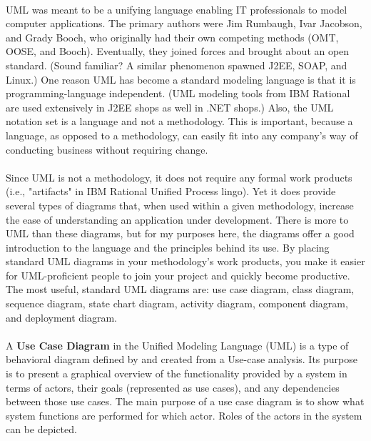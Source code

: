 \paragraph{}
UML was meant to be a unifying language enabling IT professionals to model computer applications. The primary authors were Jim Rumbaugh, Ivar Jacobson, and Grady Booch, who originally had their own competing methods (OMT, OOSE, and Booch). Eventually, they joined forces and brought about an open standard. (Sound familiar? A similar phenomenon spawned J2EE, SOAP, and Linux.) One reason UML has become a standard modeling language is that it is programming-language independent. (UML modeling tools from IBM Rational are used extensively in J2EE shops as well in .NET shops.) Also, the UML notation set is a language and not a methodology. This is important, because a language, as opposed to a methodology, can easily fit into any company's way of conducting business without requiring change.
\paragraph{}
Since UML is not a methodology, it does not require any formal work products (i.e., "artifacts" in IBM Rational Unified Process lingo). Yet it does provide several types of diagrams that, when used within a given methodology, increase the ease of understanding an application under development. There is more to UML than these diagrams, but for my purposes here, the diagrams offer a good introduction to the language and the principles behind its use. By placing standard UML diagrams in your methodology's work products, you make it easier for UML-proficient people to join your project and quickly become productive. The most useful, standard UML diagrams are: use case diagram, class diagram, sequence diagram, state chart diagram, activity diagram, component diagram, and deployment diagram.

\paragraph{}
A \textbf{Use Case Diagram} in the Unified Modeling Language (UML) is a type of behavioral diagram defined by and created from a Use-case analysis. Its purpose is to present a graphical overview of the functionality provided by a system in terms of actors, their goals (represented as use cases), and any dependencies between those use cases. The main purpose of a use case diagram is to show what system functions are performed for which actor. Roles of the actors in the system can be depicted.
